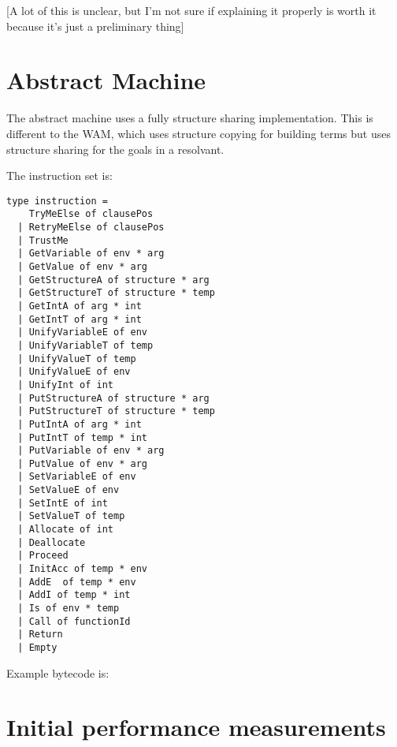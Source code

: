 \documentclass[12pt,a4paper,twoside]{article}
\begin{document}
[A lot of this is unclear, but I'm not sure if explaining it properly is worth it because it's just a preliminary thing] 


\section{Abstract Machine}

The abstract machine uses a fully structure sharing implementation. This is different to the WAM, which uses structure copying for building terms but uses structure sharing for the goals in a resolvant.

The instruction set is:

\begin{verbatim}
type instruction =
    TryMeElse of clausePos
  | RetryMeElse of clausePos
  | TrustMe
  | GetVariable of env * arg
  | GetValue of env * arg
  | GetStructureA of structure * arg
  | GetStructureT of structure * temp
  | GetIntA of arg * int
  | GetIntT of arg * int
  | UnifyVariableE of env
  | UnifyVariableT of temp
  | UnifyValueT of temp
  | UnifyValueE of env
  | UnifyInt of int
  | PutStructureA of structure * arg
  | PutStructureT of structure * temp
  | PutIntA of arg * int
  | PutIntT of temp * int
  | PutVariable of env * arg
  | PutValue of env * arg
  | SetVariableE of env
  | SetValueE of env
  | SetIntE of int
  | SetValueT of temp
  | Allocate of int
  | Deallocate
  | Proceed
  | InitAcc of temp * env
  | AddE  of temp * env
  | AddI of temp * int
  | Is of env * temp
  | Call of functionId
  | Return
  | Empty
\end{verbatim}

Example bytecode is:

\section{Initial performance measurements}
\end{document}
